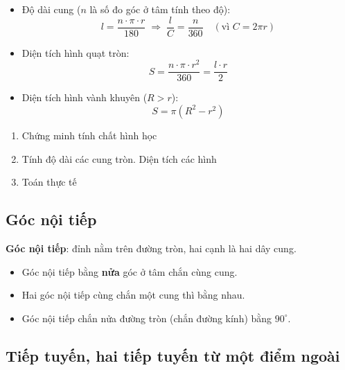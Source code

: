 \documentclass[12pt,a4paper]{article}
\begin{document}
\begin{congthuc}
  \begin{itemize}
    \item Độ dài cung ($n$ là số đo góc ở tâm tính theo độ):
    \[l = \frac{n \cdot \pi \cdot r}{180} \;\Rightarrow\; \frac{l}{C} = \frac{n}{360} \quad (\text{vì } C = 2\pi r)\]
    \item Diện tích hình quạt tròn:
    \[S = \frac{n \cdot \pi \cdot r^2}{360} = \frac{l \cdot r}{2}\]
    \item Diện tích hình vành khuyên ($R > r$):
    \[S = \pi(R^2 - r^2)\]
  \end{itemize}
\end{congthuc}

\begin{enumerate}[label=\textbf{Dạng \arabic*:}, leftmargin=*, align=left]
  \item Chứng minh tính chất hình học
  \item Tính độ dài các cung tròn. Diện tích các hình
  \item Toán thực tế
\end{enumerate}

\subsection{Góc nội tiếp}

\begin{dinhnghia}
  \textbf{Góc nội tiếp}: đỉnh nằm trên đường tròn, hai cạnh là hai dây cung.
\end{dinhnghia}

\begin{tinhchat}
  \begin{itemize}
    \item Góc nội tiếp bằng \textbf{nửa} góc ở tâm chắn cùng cung.
    \item Hai góc nội tiếp cùng chắn một cung thì bằng nhau.
    \item Góc nội tiếp chắn nửa đường tròn (chắn đường kính) bằng $90^\circ$.
  \end{itemize}
\end{tinhchat}

\subsection{Tiếp tuyến, hai tiếp tuyến từ một điểm ngoài}
\end{document}
